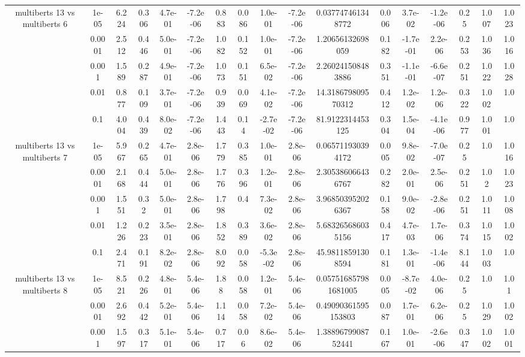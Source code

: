 \begin{tabular}{|c|c|c|c|c|c|c|c|c|c|c|c|c|c|c|c|c|}
\hline
\multirow{5}{*}{multiberts 13 vs multiberts 6} & 1e-05 & 6.224 & 0.306 & 4.7e-01 & -7.2e-06 & 0.883 & 0.086 & 1.0e-01 & -7.2e-06 & 0.037747461348772 & 0.006 & 3.7e-02 & -1.2e-06 & 0.25 & 1.007 & 1.023 \\
 & 0.0001 & 2.512 & 0.446 & 5.0e-01 & -7.2e-06 & 1.082 & 0.152 & 1.0e-01 & -7.2e-06 & 1.20656132698059 & 0.182 & -1.7e-01 & 2.2e-06 & 0.253 & 1.036 & 1.016 \\
 & 0.001 & 1.589 & 0.287 & 4.9e-01 & -7.2e-06 & 1.073 & 0.151 & 6.5e-02 & -7.2e-06 & 2.260241508483886 & 0.351 & -1.1e-01 & -6.6e-07 & 0.251 & 1.022 & 1.028 \\
 & 0.01 & 0.877 & 0.109 & 3.7e-01 & -7.2e-06 & 0.939 & 0.069 & 4.1e-02 & -7.2e-06 & 14.318679809570312 & 0.412 & 1.2e-02 & 1.2e-06 & 0.322 & 1.002 & 1.0 \\
 & 0.1 & 4.004 & 0.439 & 8.0e-02 & -7.2e-06 & 1.443 & 0.14 & -2.7e-02 & -7.2e-06 & 81.9122314453125 & 0.304 & 1.5e-04 & -4.1e-06 & 0.977 & 1.001 & 1.0 \\
\hline
\multirow{5}{*}{multiberts 13 vs multiberts 7} & 1e-05 & 5.967 & 0.265 & 4.7e-01 & 2.8e-06 & 1.779 & 0.385 & 1.0e-01 & 2.8e-06 & 0.065711930394172 & 0.005 & 9.8e-02 & -7.0e-07 & 0.25 & 1.0 & 1.016 \\
 & 0.0001 & 2.168 & 0.444 & 5.0e-01 & 2.8e-06 & 1.776 & 0.396 & 1.2e-01 & 2.8e-06 & 2.305386066436767 & 0.282 & 2.0e-01 & 2.5e-06 & 0.251 & 1.02 & 1.023 \\
 & 0.001 & 1.551 & 0.32 & 5.0e-01 & 2.8e-06 & 1.798 & 0.4 & 7.3e-02 & 2.8e-06 & 3.968503952026367 & 0.158 & 9.0e-02 & -2.8e-06 & 0.251 & 1.011 & 1.008 \\
 & 0.01 & 1.226 & 0.223 & 3.5e-01 & 2.8e-06 & 1.852 & 0.389 & 3.6e-02 & 2.8e-06 & 5.683265686035156 & 0.417 & 4.7e-03 & 1.7e-06 & 0.374 & 1.015 & 1.002 \\
 & 0.1 & 2.471 & 0.191 & 8.2e-02 & 2.8e-06 & 8.092 & 0.058 & -5.3e-02 & 2.8e-06 & 45.98118591308594 & 0.181 & 1.3e-01 & -1.4e-06 & 8.144 & 1.003 & 1.0 \\
\hline
\multirow{5}{*}{multiberts 13 vs multiberts 8} & 1e-05 & 8.521 & 0.226 & 4.8e-01 & 5.4e-06 & 1.88 & 0.058 & 1.2e-01 & 5.4e-06 & 0.057516857981681005 & 0.005 & -8.7e-02 & 4.0e-06 & 0.25 & 1.0 & 1.01 \\
 & 0.0001 & 2.692 & 0.442 & 5.2e-01 & 5.4e-06 & 1.114 & 0.058 & 7.2e-02 & 5.4e-06 & 0.49090361595153803 & 0.087 & 1.7e-01 & 6.2e-06 & 0.25 & 1.029 & 1.002 \\
 & 0.001 & 1.597 & 0.317 & 5.1e-01 & 5.4e-06 & 0.717 & 0.06 & 8.6e-02 & 5.4e-06 & 1.3889679908752441 & 0.167 & 1.0e-01 & -2.6e-06 & 0.347 & 1.002 & 1.001 \\

\end{tabular}
